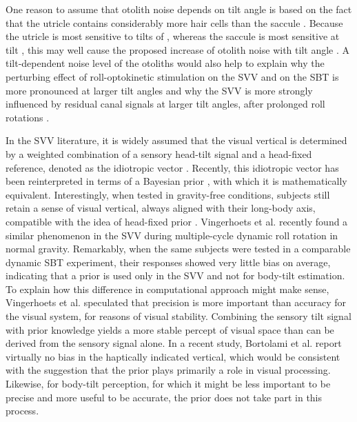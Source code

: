 One reason to assume that otolith noise depends on tilt angle is based on the fact that the utricle contains considerably more hair cells than the saccule \cite{rosenhall1972, rosenhall1974}. Because the utricle is most sensitive to tilts of \textdegree, whereas the saccule is most sensitive at  tilt \cite{jaeger2008}, this may well cause the proposed increase of otolith noise with tilt angle \cite{tarnutzer2010}. A tilt-dependent noise level of the otoliths would also help to explain why the perturbing effect of roll-optokinetic stimulation on the SVV \cite{dichgans1974, fernandez1976} and on the SBT \cite{young1975} is more pronounced at larger tilt angles and why the SVV is more strongly influenced by residual canal signals at larger tilt angles, after prolonged roll rotations \cite{lorincz2008}.

In the SVV literature, it is widely assumed that the visual vertical is determined by a weighted combination of a sensory head-tilt signal and a head-fixed reference, denoted as the idiotropic vector \cite{mittelstaedt1983}. Recently, this idiotropic vector has been reinterpreted in terms of a Bayesian prior \cite{eggert1998, macneilage2007, devrijer2008}, with which it is mathematically equivalent. Interestingly, when tested in gravity-free conditions, subjects still retain a sense of visual vertical, always aligned with their long-body axis, compatible with the idea of head-fixed prior \cite{mittelstaedt1983}. Vingerhoets et al. \citeyear{vingerhoets2008} recently found a similar phenomenon in the SVV during multiple-cycle dynamic roll rotation in normal gravity. Remarkably, when the same subjects were tested in a comparable dynamic SBT experiment, their responses showed very little bias on average, indicating that a prior is used only in the SVV and not for body-tilt estimation. To explain how this difference in computational approach might make sense, Vingerhoets et al. \citeyear{vingerhoets2008} speculated that precision is more important than accuracy for the visual system, for reasons of visual stability. Combining the sensory tilt signal with prior knowledge yields a more stable percept of visual space than can be derived from the sensory signal alone. In a recent study, Bortolami et al. \citeyear{bortolami2006} report virtually no bias in the haptically indicated vertical, which would be consistent with the suggestion that the prior plays primarily a role in visual processing. Likewise, for body-tilt perception, for which it might be less important to be precise and more useful to be accurate, the prior does not take part in this process.


